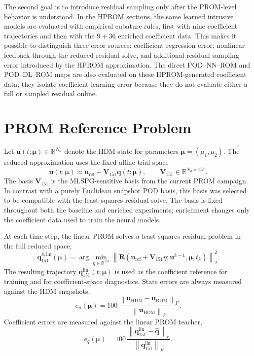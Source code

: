 \documentclass[11pt]{article}
\newcommand{\q}{\mathbf q}
\newcommand{\V}{\mathbf V}
\newcommand{\uvec}{\mathbf u}
\newcommand{\mub}{\bm\mu}
\newcommand{\R}{\mathbf R}
\newcommand{\norm}[1]{\left\lVert #1 \right\rVert}
\begin{document}
The second goal is to introduce residual sampling only after the PROM-level behavior is understood.  In the HPROM
sections, the same learned intrusive models are evaluated with empirical cubature rules, first with nine coefficient
trajectories and then with the \(9+36\) enriched coefficient data.  This makes it possible to distinguish three error
sources: coefficient regression error, nonlinear feedback through the reduced residual solve, and additional
residual-sampling error introduced by the HPROM approximation.  The direct POD--NN--ROM and POD--DL--ROM maps are
also evaluated on these HPROM-generated coefficient data; they isolate coefficient-learning error because they do
not evaluate either a full or sampled residual online.

\section{PROM Reference Problem}
Let \(\uvec(t;\mub)\in\mathbb R^{N_h}\) denote the HDM state for parameters
\(\mub=(\mu_1,\mu_2)\).  The reduced approximation uses the fixed affine trial space
\begin{equation}
  \uvec(t;\mub) \approx \uvec_{\mathrm{ref}} + \V_{151}\q(t;\mub),
  \qquad \V_{151}\in\mathbb R^{N_h\times151}.
  \label{eq:prom-affine-space}
\end{equation}
The basis \(\V_{151}\) is the MLSPG-sensitive basis from the current PROM campaign.  In contrast with a purely
Euclidean snapshot POD basis, this basis was selected to be compatible with the least-squares residual solve.  The
basis is fixed throughout both the baseline and enriched experiments; enrichment changes only the coefficient data
used to train the neural models.

At each time step, the linear PROM solves a least-squares residual problem in the full reduced space,
\begin{equation}
  \q_{151}^{k,\mathrm{lin}}(\mub)
  = \arg\min_{\eta\in\mathbb R^{151}}
  \left\lVert
  \R\!\left(\uvec_{\mathrm{ref}} + \V_{151}\eta;\uvec^{k-1},\mub,t_k\right)
  \right\rVert_2^2 .
  \label{eq:linear-prom-lspg}
\end{equation}
The resulting trajectory \(\q_{151}^{\mathrm{lin}}(t;\mub)\) is used as the coefficient reference for training and
for coefficient-space diagnostics.  State errors are always measured against the HDM snapshots,
\begin{equation}
  e_u(\mub) = 100\,\frac{\norm{\uvec_{\mathrm{HDM}}-\uvec_{\mathrm{ROM}}}_F}
  {\norm{\uvec_{\mathrm{HDM}}}_F} .
\end{equation}
Coefficient errors are measured against the linear PROM teacher,
\begin{equation}
  e_q(\mub) = 100\,\frac{\norm{\q^{\mathrm{lin}}_{151}-\widehat{\q}}_F}
  {\norm{\q^{\mathrm{lin}}_{151}}_F} .
\end{equation}
\end{document}
